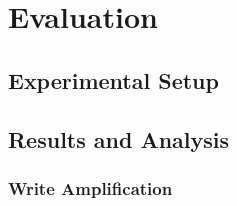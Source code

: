 \chapter{Evaluation}
\label{chap:evaluation}



\section{Experimental Setup}

\section{Results and Analysis}
\subsection{Write Amplification}

